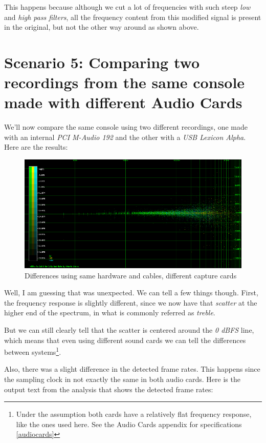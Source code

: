 \documentclass[10pt,a4paper]{report}
\begin{document}
This happens because although we cut a lot of frequencies with such steep \textit{low} and \textit{high pass filters}, all the frequency content from this modified signal is present in the original, but not the other way around as shown above.

\section{Scenario 5: Comparing two recordings from the same console made with different Audio Cards}

We'll now compare the same console using two different recordings, one made with an internal \textit{PCI M-Audio 192} and the other with a \textit{USB Lexicon Alpha}. Here are the results:

\begin{figure}[H]
	\centering
	\includegraphics[width=1.0\linewidth]{images/interpretation/Plot5-1-All.png}
	\caption[Reversed FM Missing]{Differences using same hardware and cables, different capture cards}
	\label{fig:plot5-1-all}
\end{figure}

Well, I am guessing that was unexpected. We can tell a few things though. First, the frequency response is slightly different, since we now have that \textit{scatter} at the higher end of the spectrum, in what is commonly referred as \textit{treble}.

But we can still clearly tell that the scatter is centered around the \textit{0 dBFS} line, which means that even using different sound cards we can tell the differences between systems\footnote{Under the assumption both cards have a relatively flat frequency response, like the ones used here. See the Audio Cards appendix for specifications \ref{audiocards}}. 

Also, there was a slight difference in the detected frame rates. This happens since the sampling clock in not exactly the same in both audio cards. Here is the output text from the analysis that shows the detected frame rates:
\end{document}
